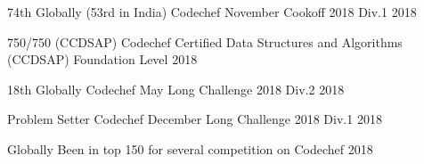 \begin{cvhonors}

\cvhonor
{74th Globally (53rd in India)} %
{Codechef November Cookoff 2018 Div.1} %
{} %
{2018} %


\cvhonor
{750/750 (CCDSAP)} %
{Codechef Certified Data Structures and Algorithms (CCDSAP) Foundation Level} %
{} %
{2018} %


\cvhonor
{18th Globally} %
{Codechef May Long Challenge 2018 Div.2} %
{} %
{2018} %


\cvhonor
{Problem Setter} %
{Codechef December Long Challenge 2018 Div.1} %
{} %
{2018} %


\cvhonor
{Globally} %
{Been in top 150 for several competition on Codechef} %
{} %
{2018} %










\end{cvhonors}